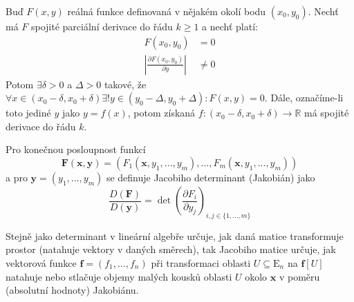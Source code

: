 \documentclass[../main.tex]{subfiles}
\begin{document}
\begin{theorem}
	Buď $F(x,y)$ reálná funkce definovaná v nějakém okolí bodu $(x_0, y_0)$. Nechť má $F$ spojité parciální
	derivace do řádu $k \geq 1$ a nechť platí:
	\begin{align*}
	    F(x_0, y_0) &= 0\\
	    \left| \frac{\partial F(x_0,y_0)}{\partial y} \right| &\neq 0
	\end{align*}
	Potom $ \exists \delta > 0$ a $\Delta > 0$ takové, že
	$\forall x \in (x_0 - \delta , x_0 + \delta) \exists! y \in (y_0 - \Delta , y_0 + \Delta): F(x,y) = 0$.
	Dále, označíme-li toto jediné $y$ jako $y = f(x)$, potom získaná
	$f: (x_0 - \delta , x_0 + \delta ) \to \mathbb{R}$ má spojité derivace do řádu $k$.
\end{theorem}



\begin{definition}
	Pro konečnou posloupnost funkcí
	\[ \mathbf{F}(\mathbf{x}, \mathbf{y}) =
	(F_1(\mathbf{x}, y_1, ..., y_m), ... , F_m(\mathbf{x}, y_1, ..., y_m)) \]
	a pro $\mathbf{y} = (y_1, ... , y_m)$ se definuje Jacobiho determinant (Jakobián) jako
	\[ \frac{D(\mathbf{F})}{D(\mathbf{y})} =
	\det \left( \frac{\partial F_i}{\partial y_j} \right)_{i,j \in \{ 1, ... , m\}} \]
\end{definition}

\begin{intuition}
	Stejně jako determinant v lineární algebře určuje, jak daná matice transformuje prostor (natahuje vektory v daných směrech), tak Jacobiho matice určuje, jak vektorová funkce $\mathbf{f} = \left(f_1, \ldots, f_n\right)$ při transformaci oblasti $U \subseteq \mathrm{E}_n$ na $\mathbf{f}[U]$ natahuje nebo stlačuje objemy malých kousků oblasti $U$ okolo $\mathbf{x}$ v poměru (absolutní hodnoty) Jakobiánu.
\end{intuition}
\end{document}
